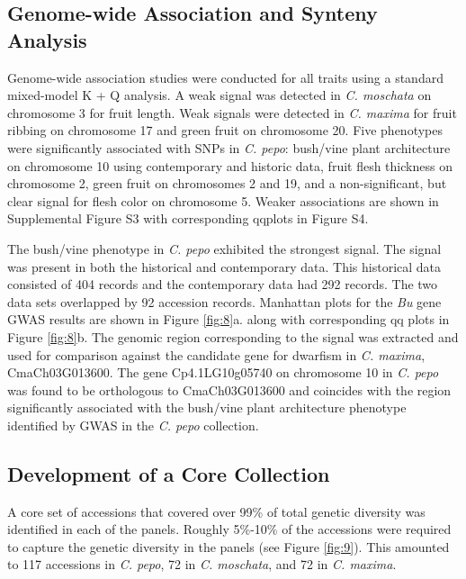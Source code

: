 \documentclass[utf8]{FrontiersinHarvard} %
\begin{document}
\subsection{Genome-wide Association and Synteny Analysis}
Genome-wide association studies were conducted for all traits using a standard mixed-model K + Q  analysis. A weak signal was detected in \textit{C. moschata} on chromosome 3 for fruit length. Weak signals were detected in \textit{C. maxima} for fruit ribbing on chromosome 17 and green fruit on chromosome 20. Five phenotypes were significantly associated with SNPs in \textit{C. pepo}: bush/vine plant architecture on chromosome 10 using contemporary and historic data, fruit flesh thickness on chromosome 2, green fruit on chromosomes 2 and 19, and a non-significant, but clear signal for flesh color on chromosome 5. Weaker associations are shown in {\color{red} Supplemental Figure S3 with corresponding qqplots in Figure S4}.

{ \color{red}The bush/vine phenotype in \textit{C. pepo} exhibited the strongest signal.} The signal was present in both the historical and contemporary data. This historical data consisted of 404 records and the contemporary data had 292 records. The two data sets overlapped by 92 accession records. Manhattan plots for the \textit{Bu} gene GWAS results are shown in Figure \ref{fig:8}a. along with corresponding qq plots in Figure \ref{fig:8}b. The genomic region corresponding to the signal was extracted and used for comparison against the candidate gene for dwarfism in \textit{C. maxima}, CmaCh03G013600. The gene Cp4.1LG10g05740 on chromosome 10 in \textit{C. pepo} was found to be orthologous to CmaCh03G013600 and coincides with the region significantly associated with the bush/vine plant architecture phenotype identified by GWAS in the \textit{C. pepo} collection. 

\subsection{Development of a Core Collection}
A core set of accessions that covered over 99\% of total genetic diversity was identified in each of the panels. Roughly 5\%-10\% of the accessions were required to capture the genetic diversity in the panels (see Figure \ref{fig:9}). This amounted to 117 accessions in \textit{C. pepo}, 72 in \textit{C. moschata}, and 72 in \textit{C. maxima}.
\end{document}
